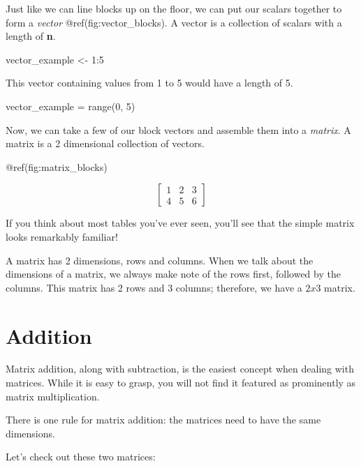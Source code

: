 \documentclass[
  letterpaper,
]{krantz}
\newenvironment{Shaded}{}{}
\newcommand{\BuiltInTok}[1]{\textcolor[rgb]{0.00,0.50,0.00}{#1}}
\newcommand{\DecValTok}[1]{\textcolor[rgb]{0.25,0.63,0.44}{#1}}
\newcommand{\NormalTok}[1]{#1}
\newcommand{\OperatorTok}[1]{\textcolor[rgb]{0.40,0.40,0.40}{#1}}
\newcommand{\OtherTok}[1]{\textcolor[rgb]{0.00,0.44,0.13}{#1}}
\newcommand{\SpecialCharTok}[1]{\textcolor[rgb]{0.25,0.44,0.63}{#1}}
\begin{document}
Just like we can line blocks up on the floor, we can put our scalars
together to form a \emph{vector} @ref(fig:vector\_blocks). A vector is a
collection of scalars with a length of \textbf{n}.

\begin{Shaded}
\begin{Highlighting}[]
\NormalTok{vector\_example }\OtherTok{\textless{}{-}} \DecValTok{1}\SpecialCharTok{:}\DecValTok{5}
\end{Highlighting}
\end{Shaded}

This vector containing values from 1 to 5 would have a length of 5.

\begin{Shaded}
\begin{Highlighting}[]
\NormalTok{vector\_example }\OperatorTok{=} \BuiltInTok{range}\NormalTok{(}\DecValTok{0}\NormalTok{, }\DecValTok{5}\NormalTok{)}
\end{Highlighting}
\end{Shaded}

Now, we can take a few of our block vectors and assemble them into a
\emph{matrix}. A matrix is a 2 dimensional collection of vectors.

@ref(fig:matrix\_blocks)

\[
\begin{bmatrix}
1 & 2 & 3\\
4 & 5 & 6
\end{bmatrix}
\]

If you think about most tables you've ever seen, you'll see that the
simple matrix looks remarkably familiar!

A matrix has 2 dimensions, rows and columns. When we talk about the
dimensions of a matrix, we always make note of the rows first, followed
by the columns. This matrix has 2 rows and 3 columns; therefore, we have
a \(2x3\) matrix.

\section{Addition}\label{addition}

Matrix addition, along with subtraction, is the easiest concept when
dealing with matrices. While it is easy to grasp, you will not find it
featured as prominently as matrix multiplication.

There is one rule for matrix addition: the matrices need to have the
same dimensions.

Let's check out these two matrices:
\end{document}

